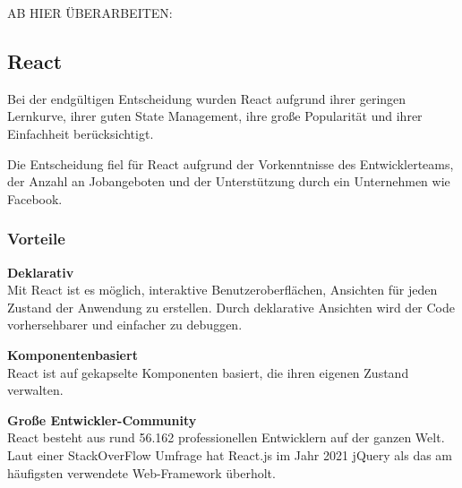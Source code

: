 


AB HIER ÜBERARBEITEN:
\\

\subsection{React}
Bei der endgültigen Entscheidung wurden React aufgrund ihrer geringen Lernkurve, ihrer guten State Management, ihre große Popularität und ihrer Einfachheit berücksichtigt.

Die Entscheidung fiel für React aufgrund der Vorkenntnisse des Entwicklerteams, der Anzahl an Jobangeboten und der Unterstützung durch ein Unternehmen wie Facebook.


\subsubsection{Vorteile}
\textbf{Deklarativ} \\
Mit React ist es möglich, interaktive Benutzeroberflächen, Ansichten für jeden Zustand der Anwendung zu erstellen. %
Durch deklarative Ansichten wird der Code vorhersehbarer und einfacher zu debuggen.
\newline

\textbf{Komponentenbasiert}\\
React ist auf gekapselte Komponenten basiert, die ihren eigenen Zustand verwalten.
\newline

\textbf{Große Entwickler-Community}\\
React besteht aus rund 56.162 professionellen Entwicklern auf der ganzen Welt.
Laut einer StackOverFlow Umfrage hat React.js im Jahr 2021 jQuery als das am häufigsten verwendete Web-Framework überholt. {\cite{SO01}}
\newpage

